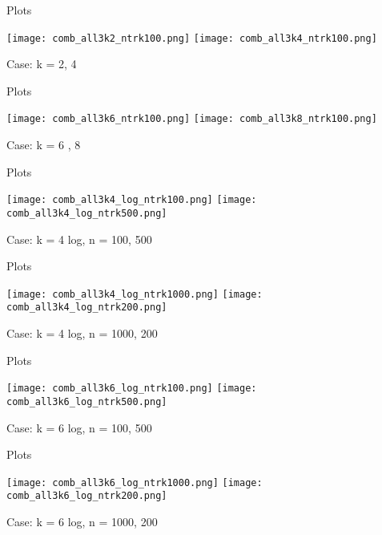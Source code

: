 \documentclass[aspectratio=169,compress,10pt]{beamer} %
\begin{document}
\begin{frame}{Plots}
\begin{adjustwidth}{-2em}{-2em}
\texttt{[image: comb\_all3k2\_ntrk100.png]}
\texttt{[image: comb\_all3k4\_ntrk100.png]}
\caption{Case: k = 2, 4}
\end{adjustwidth}
\end{frame}

\begin{frame}{Plots}
\begin{adjustwidth}{-2em}{-2em}
\texttt{[image: comb\_all3k6\_ntrk100.png]}
\texttt{[image: comb\_all3k8\_ntrk100.png]}
\caption{Case: k = 6 , 8}
\end{adjustwidth}
\end{frame}

\begin{frame}{Plots}
\begin{adjustwidth}{-2em}{-2em}
\texttt{[image: comb\_all3k4\_log\_ntrk100.png]}
\texttt{[image: comb\_all3k4\_log\_ntrk500.png]}
\caption{Case: k = 4 log, n = 100, 500}
\end{adjustwidth}
\end{frame}

\begin{frame}{Plots}
\begin{adjustwidth}{-2em}{-2em}
\texttt{[image: comb\_all3k4\_log\_ntrk1000.png]}
\texttt{[image: comb\_all3k4\_log\_ntrk200.png]}
\caption{Case: k = 4 log, n = 1000, 200}
\end{adjustwidth}
\end{frame}

\begin{frame}{Plots}
\begin{adjustwidth}{-2em}{-2em}
\texttt{[image: comb\_all3k6\_log\_ntrk100.png]}
\texttt{[image: comb\_all3k6\_log\_ntrk500.png]}
\caption{Case: k = 6 log, n = 100, 500}
\end{adjustwidth}
\end{frame}

\begin{frame}{Plots}
\begin{adjustwidth}{-2em}{-2em}
\texttt{[image: comb\_all3k6\_log\_ntrk1000.png]}
\texttt{[image: comb\_all3k6\_log\_ntrk200.png]}
\caption{Case: k = 6 log, n = 1000, 200}
\end{adjustwidth}
\end{frame}
\end{document}
